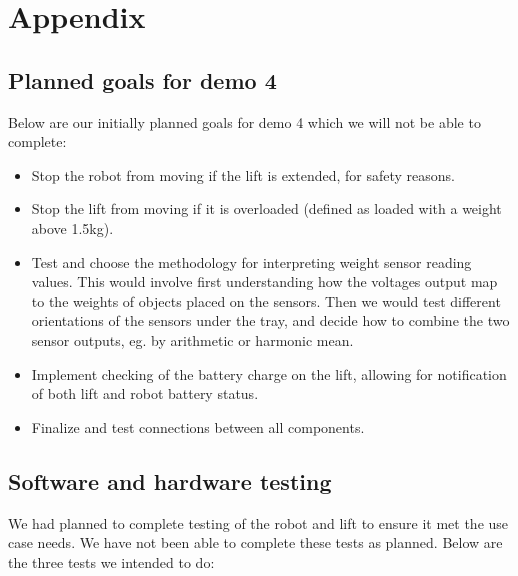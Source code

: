\documentclass{article}
\begin{document}
\clearpage
\section{Appendix}
\subsection{Planned goals for demo 4}
\label{goals}
Below are our initially planned goals for demo 4 which we will not be able to complete:
\begin{itemize}
  \item Stop the robot from moving if the lift is extended, for safety reasons.
  \item Stop the lift from moving if it is overloaded (defined as loaded with a weight above 1.5kg).
  \item Test and choose the methodology for interpreting weight sensor reading values. This would involve first understanding how the voltages output map to the weights of objects placed on the sensors. Then we would test different orientations of the sensors under the tray, and decide how to combine the two sensor outputs, eg. by arithmetic or harmonic mean. 
  \item Implement checking of the battery charge on the lift, allowing for notification of both lift and robot battery status.
  \item Finalize and test connections between all components. 
\end{itemize}
\subsection{Software and hardware testing}
\label{testing}
We had planned to complete testing of the robot and lift to ensure it met the use case needs. We have not been able to complete these tests as planned. Below are the three tests we intended to do:
\end{document}
